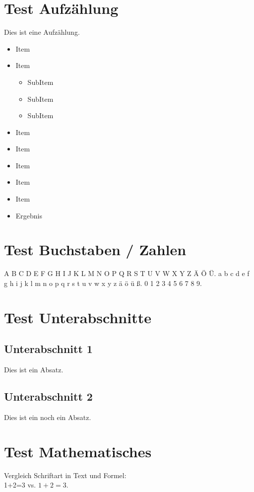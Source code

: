 \documentclass[serifmath,a0paper,noDIN,Mathematik]{tudmathposter}
\begin{document}
\section*{Test Aufzählung}
\begin{multicols}{2}
Dies ist eine Aufzählung.

\begin{itemize}
\item Item
\item Item
  \begin{itemize}
  \item SubItem
  \item SubItem
  \item SubItem
  \end{itemize}
\item Item
\item Item
\item Item
\item Item
\item Item
\item[\raisebox{.2ex}{$\Rightarrow$}] Ergebnis
\end{itemize}

\section*{Test Buchstaben / Zahlen}
A B C D E F G H I J K L M N O P Q R S T U V W X Y Z Ä Ö Ü.
a b c d e f g h i j k l m n o p q r s t u v w x y z ä ö ü ß.
0 1 2 3 4 5 6 7 8 9.

\section*{Test Unterabschnitte}
\subsection*{Unterabschnitt 1}
Dies ist ein Absatz.
\subsection*{Unterabschnitt 2}
Dies ist ein noch ein Absatz.

\vfill
\section*{Test Mathematisches}
Vergleich Schriftart in Text und Formel:\\
1+2=3 vs. $1+2=3$.


\end{multicols}
\end{document}
